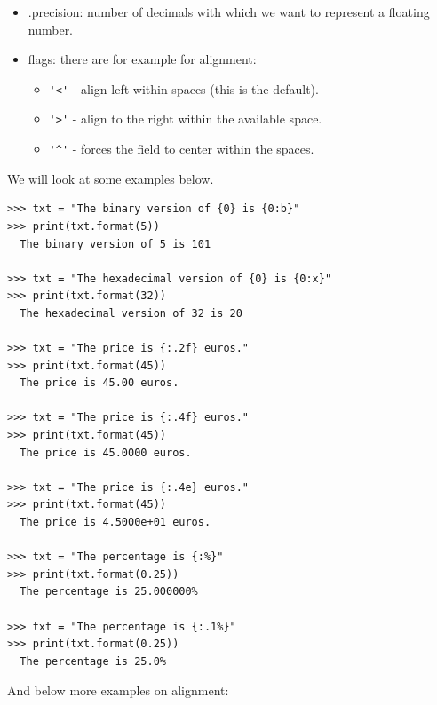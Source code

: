 \begin{itemize}
\item .precision: number of decimals with which we want to represent a floating number.

\item flags: there are for example for alignment:
\begin{itemize}
\item \verb|'<'| - align left within spaces (this is the default).
\item \verb|'>'| - align to the right within the available space.
\item \verb|'^'| - forces the field to center within the spaces.
\end{itemize}
\end{itemize}


We will look at some examples below.


\begin{Verbatim}[frame=single]
>>> txt = "The binary version of {0} is {0:b}"
>>> print(txt.format(5))
  The binary version of 5 is 101

>>> txt = "The hexadecimal version of {0} is {0:x}"
>>> print(txt.format(32))
  The hexadecimal version of 32 is 20
  
>>> txt = "The price is {:.2f} euros."
>>> print(txt.format(45))
  The price is 45.00 euros.

>>> txt = "The price is {:.4f} euros."
>>> print(txt.format(45))
  The price is 45.0000 euros.

>>> txt = "The price is {:.4e} euros."
>>> print(txt.format(45))
  The price is 4.5000e+01 euros.

>>> txt = "The percentage is {:%}"
>>> print(txt.format(0.25))
  The percentage is 25.000000%

>>> txt = "The percentage is {:.1%}"
>>> print(txt.format(0.25))
  The percentage is 25.0%  
\end{Verbatim}

And below more examples on alignment:


